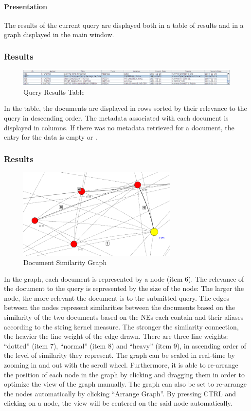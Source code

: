 \paragraph{Presentation}
The results of the current query are displayed both in a table of results and in a graph displayed in the main window.

\subsubsection{Results}
\begin{figure}[ht]
\centering
\caption{Query Results Table}
\includegraphics[width=160mm]{table.png}
\end{figure}

In the table, the documents are displayed in rows sorted by their relevance to the query in descending order. The metadata associated with each document is displayed in columns. If there was no metadata retrieved for a document, the entry for the data is empty or .

\subsubsection{Results}
\begin{figure}[ht]
\centering
\caption{Document Similarity Graph}
\includegraphics[width=80mm]{nodecloseup.png}
\end{figure}

In the graph, each document is represented by a node (item 6). The relevance of the document to the query is represented by the size of the node: The larger the node, the more relevant the document is to the submitted query. The edges between the nodes represent similarities between the documents based on the similarity of the two documents based on the NEs each contain and their aliases according to the string kernel measure. The stronger the similarity connection, the heavier the line weight of the edge drawn. There are three line weights: ``dotted'' (item 7), ``normal'' (item 8) and ``heavy'' (item 9), in ascending order of the level of similarity they represent. The graph can be scaled in real-time by zooming in and out with the scroll wheel. Furthermore, it is able to re-arrange the position of each node in the graph by clicking and dragging them in order to optimize the view of the graph manually. The graph can also be set to re-arrange the nodes automatically by clicking ``Arrange Graph''. By pressing CTRL and clicking on a node, the view will be centered on the said node automatically.

